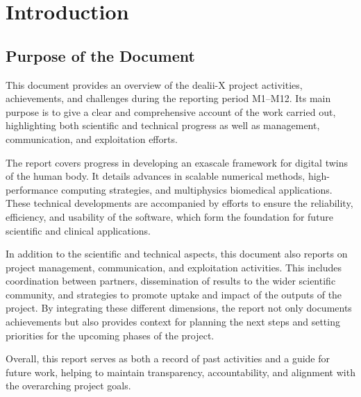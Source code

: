 \documentclass[a4paper,12pt, numbers]{article}
\begin{document}
	\vspace*{2cm}
	
	\disclaimer
	
	\newpage
	
	\tableofcontents %
	
	\newpage
	
	\section{{Introduction}}
	
	
	\subsection{Purpose of the Document}
	
	This document provides an overview of the dealii-X project activities, achievements, and challenges during the reporting period M1–M12. Its main purpose is to give a clear and comprehensive account of the work carried out, highlighting both scientific and technical progress as well as management, communication, and exploitation efforts. 
	
	The report covers progress in developing an exascale framework for digital twins of the human body. It details advances in scalable numerical methods, high-perfor\-mance computing strategies, and multiphysics biomedical applications. These technical developments are accompanied by efforts to ensure the reliability, efficiency, and usability of the software, which form the foundation for future scientific and clinical applications.
	
	In addition to the scientific and technical aspects, this document also reports on project management, communication, and exploitation activities. This includes coordination between partners, dissemination of results to the wider scientific community, and strategies to promote uptake and impact of the outputs of the project. By integrating these different dimensions, the report not only documents achievements but also provides context for planning the next steps and setting priorities for the upcoming phases of the project.
	
	Overall, this report serves as both a record of past activities and a guide for future work, helping to maintain transparency, accountability, and alignment with the overarching project goals.
	
	
	
	
\end{document}
